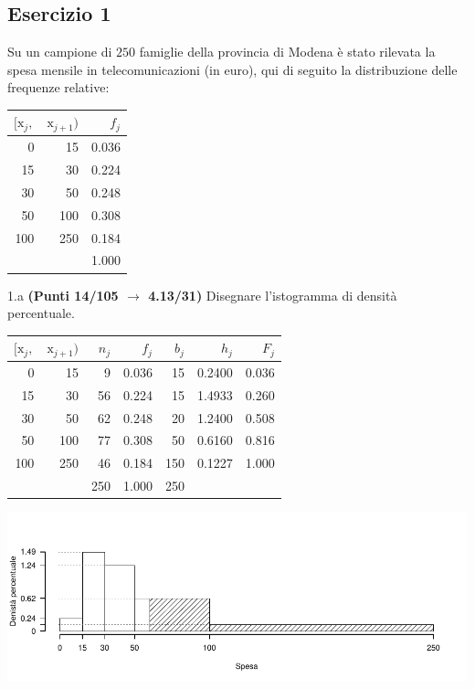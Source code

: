 \documentclass[
  11pt,
]{book}
\theoremstyle{mytheoremstyle}
\theoremstyle{mydefstyle}
\newenvironment{sol}
  {
  \begin{tcolorbox}[enhanced,breakable,arc=0.1mm,boxrule=1pt,colback=white,colframe=iblue,
  title=\bf \fontfamily{lmss}\selectfont \hspace{.5 cm} Soluzione,drop fuzzy shadow]

}{
\end{tcolorbox}
  }
\begin{document}
\subsection{Esercizio 1}\label{esercizio-1-29}

Su un campione di \(250\) famiglie della provincia di Modena è stato rilevata la spesa mensile in telecomunicazioni (in euro), qui di seguito
la distribuzione delle frequenze relative:

\begin{table}[H]
\centering
\begin{tabular}{rrr}
\toprule
$[\text{x}_j,$ & $\text{x}_{j+1})$ & $f_j$\\
\midrule
0 & 15 & 0.036\\
15 & 30 & 0.224\\
30 & 50 & 0.248\\
50 & 100 & 0.308\\
100 & 250 & 0.184\\
 &  & 1.000\\
\bottomrule
\end{tabular}
\end{table}

1.a \textbf{(Punti 14/105 \(\rightarrow\) 4.13/31)} Disegnare l'istogramma di densità percentuale.

\begin{sol}

\begin{table}[H]
\centering
\begin{tabular}{rrrrrrr}
\toprule
$[\text{x}_j,$ & $\text{x}_{j+1})$ & $n_j$ & $f_j$ & $b_j$ & $h_j$ & $F_j$\\
\midrule
0 & 15 & 9 & 0.036 & 15 & 0.2400 & 0.036\\
15 & 30 & 56 & 0.224 & 15 & 1.4933 & 0.260\\
30 & 50 & 62 & 0.248 & 20 & 1.2400 & 0.508\\
50 & 100 & 77 & 0.308 & 50 & 0.6160 & 0.816\\
100 & 250 & 46 & 0.184 & 150 & 0.1227 & 1.000\\
 &  & 250 & 1.000 & 250 &  & \\
\bottomrule
\end{tabular}
\end{table}

\begin{center}\includegraphics{Esami_passati_con_soluzioni_files/figure-latex/2023-186-1} \end{center}

\end{sol}
\end{document}
